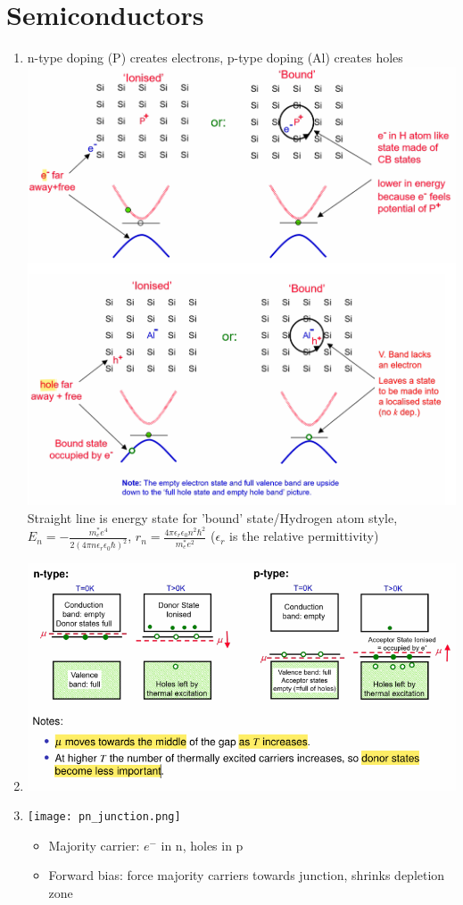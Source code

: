 \documentclass{article}
\theoremstyle{remark}
\theoremstyle{remark}
\begin{document}
\section*{Semiconductors}
\begin{enumerate}
    \item n-type doping (P) creates electrons, p-type doping (Al) creates holes\newline
        \includegraphics*[width=0.75\linewidth]{cmp_doping.png}\newline
        Straight line is energy state for 'bound' state/Hydrogen atom style, $E_n=-\frac{m^*_e e^4}{2(4\pi n\epsilon_r\epsilon_0\hbar)^2}$, $r_n=\frac{4\pi\epsilon_r\epsilon_0 n^2\hbar^2}{m^*_e e^2}$
        ($\epsilon_r$ is the relative permittivity)
    \item \includegraphics*[width=0.7\linewidth]{cmp_mu_doped_semiconductor.png}
    \item \texttt{[image: pn\_junction.png]}
        \begin{itemize}
            \item Majority carrier: $e^-$ in n, holes in p
            \item Forward bias: force majority carriers towards junction, shrinks depletion zone

\end{itemize}
\end{enumerate}
\end{document}
